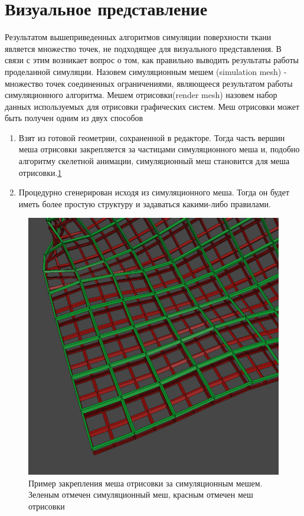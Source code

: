 \section{Визуальное представление} \label{ch3:rendering}

	Результатом вышеприведенных алгоритмов симуляции поверхности ткани является множество точек, не подходящее для визуального представления. В связи с этим возникает вопрос о том, как правильно выводить результаты работы проделанной симуляции. Назовем симуляционным мешем (simulation mesh) - множество точек соединенных ограничениями, являющееся результатом работы симуляционного алгоритма. Мешем отрисовки(render mesh) назовем набор данных используемых для отрисовки графических систем. Меш отрисовки может быть получен одним из двух способов
	\begin{enumerate}[1.]
		\item Взят из готовой геометрии, сохраненной в редакторе. Тогда часть вершин меша отрисовки закрепляется за частицами симуляционного меша и, подобно алгоритму скелетной анимации, симуляционный меш становится  для меша отрисовки.\ref{fig:meshSkinning}
		\item Процедурно сгенерирован исходя из симуляционного меша. Тогда он будет иметь более простую структуру и задаваться какими-либо правилами.
	\end{enumerate}
	
	\begin{figure}[ht!] 
		\center
		\includegraphics [scale=0.5] {my_folder/images//simrendermesh}
		\caption{Пример закрепления меша отрисовки за симуляционным мешем. Зеленым отмечен симуляционный меш, красным отмечен меш отрисовки}
		\label{fig:meshSkinning}  
	\end{figure}
	
